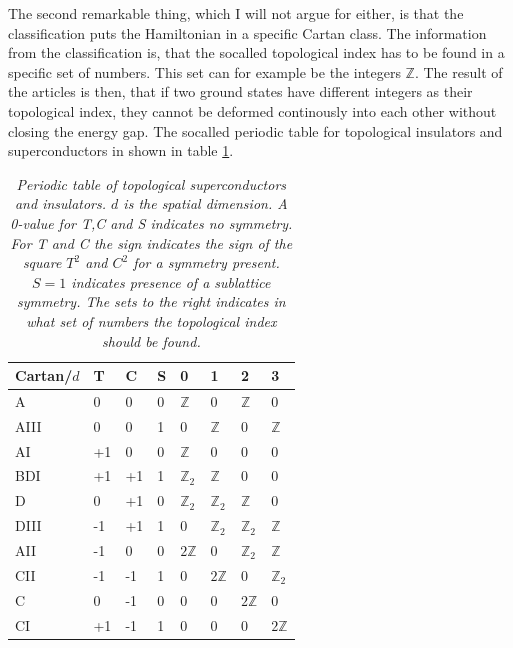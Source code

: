 The second remarkable thing, which I will not argue for either, is that the classification puts the Hamiltonian in a specific Cartan class. The information from the classification is, that the socalled topological index has to be found in a specific set of numbers. This set can for example be the integers $\mathbb{Z}$. The result of the articles is then, that if two ground states have different integers as their topological index, they cannot be deformed continously into each other without closing the energy gap. The socalled periodic table for topological insulators and superconductors in shown in table \ref{tab.PeriodicTableTISC}.

\begin{table}[htb]
\centering
\caption{\textit{Periodic table of topological superconductors and insulators. $d$ is the spatial dimension. A 0-value for T,C and S indicates no symmetry. For T and C the sign indicates the sign of the square $T^2$ and $C^2$ for a symmetry present. $S=1$ indicates presence of a sublattice symmetry. The sets to the right indicates in what set of numbers the topological index should be found. }}
\begin{tabular}{|l|l l l|l l l l|}
\hline Cartan/$d$   &  T &  C & S					& 0 & 1 & 2 & 3 \\
\hline A    		&  0 &  0 & 0					& $\mathbb{Z}$ & 0 & $\mathbb{Z}$ & 0   			 \\
\hline AIII 		&  0 &  0 & 1					& 0 & $\mathbb{Z}$ & 0 & $\mathbb{Z}$   			 \\
\hline AI   		& +1 &  0 & 0					& $\mathbb{Z}$ & 0 & 0 & 0 			    			 \\
\hline BDI	       	& +1 & +1 & 1 					& $\mathbb{Z}_2$ & $\mathbb{Z}$ & 0 & 0 			 \\
\hline D	       	&  0 & +1 & 0 					& $\mathbb{Z}_2$ & $\mathbb{Z}_2$ & $\mathbb{Z}$ & 0 \\
\hline DIII	       	& -1 & +1 & 1 					& 0 & $\mathbb{Z}_2$ & $\mathbb{Z}_2$ & $\mathbb{Z}$ \\
\hline AII	       	& -1 &  0 & 0 				 	& $2\mathbb{Z}$ & 0 & $\mathbb{Z}_2$ & $\mathbb{Z}$  \\
\hline CII	       	& -1 & -1 & 1 					& 0 & $2\mathbb{Z}$ & 0 & $\mathbb{Z}_2$  			 \\
\hline C	       	&  0 & -1 & 0 					& 0 & 0 & $2\mathbb{Z}$ & 0  						 \\
\hline CI	       	& +1 & -1 & 1 					& 0 & 0 & 0 & $2\mathbb{Z}$  						 \\
\hline 
\end{tabular}
\label{tab.PeriodicTableTISC}
\end{table}

